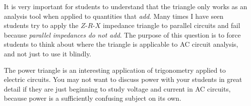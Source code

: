 
It is very important for students to understand that the triangle only works as an analysis tool when applied to quantities that {\it add}.  Many times I have seen students try to apply the $Z$-$R$-$X$ impedance triangle to parallel circuits and fail because {\it parallel impedances do not add}.  The purpose of this question is to force students to think about where the triangle is applicable to AC circuit analysis, and not just to use it blindly.

The power triangle is an interesting application of trigonometry applied to electric circuits.  You may not want to discuss power with your students in great detail if they are just beginning to study voltage and current in AC circuits, because power is a sufficiently confusing subject on its own.




